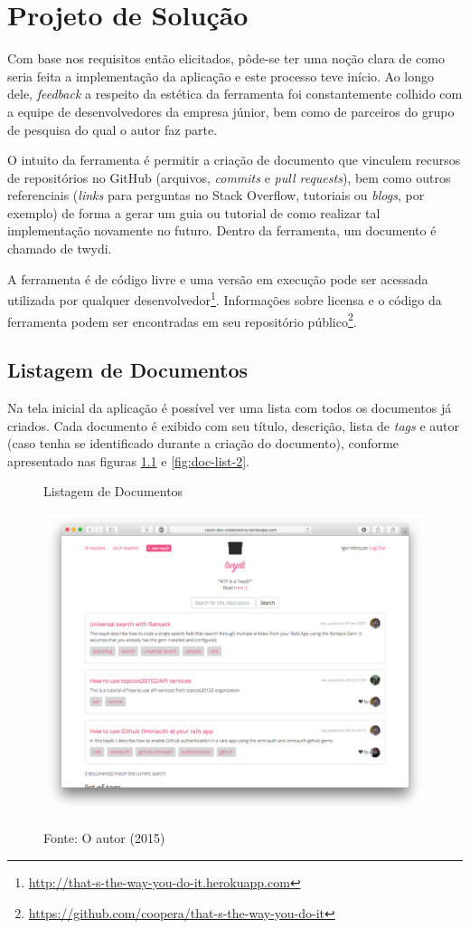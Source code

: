 \chapter{Projeto de Solução}

Com base nos requisitos então elicitados, pôde-se ter uma noção clara de como seria feita a implementação da aplicação e este processo teve início. Ao longo dele, \textit{feedback} a respeito da estética da ferramenta foi constantemente colhido com a equipe de desenvolvedores da empresa júnior, bem como de parceiros do grupo de pesquisa do qual o autor faz parte.

O intuito da ferramenta é permitir a criação de documento que vinculem recursos de repositórios no GitHub (arquivos, \textit{commits} e \textit{pull requests}), bem como outros referenciais (\textit{links} para perguntas no Stack Overflow, tutoriais ou \textit{blogs}, por exemplo) de forma a gerar um guia ou tutorial de como realizar tal implementação novamente no futuro. Dentro da ferramenta, um documento é chamado de twydi.

A ferramenta é de código livre e uma versão em execução pode ser acessada utilizada por qualquer desenvolvedor\footnote{\url{http://that-s-the-way-you-do-it.herokuapp.com}}. Informações sobre licensa e o código da ferramenta podem ser encontradas em seu repositório público\footnote{\url{https://github.com/coopera/that-s-the-way-you-do-it}}.

\section{Listagem de Documentos}

Na tela inicial da aplicação é possível ver uma lista com todos os documentos já criados. Cada documento é exibido com seu título, descrição, lista de \textit{tags} e autor (caso tenha se identificado durante a criação do documento), conforme apresentado nas figuras \ref{fig:doc-list-1} e \ref{fig:doc-list-2}.

\begin{figure}[ht]
	\centering
    \caption{Listagem de Documentos}
    \includegraphics[width=13cm]{Imagens/print-lista-1.png}
		\label{fig:doc-list-1}
	\caption*{Fonte: O autor (2015)}
\end{figure}


